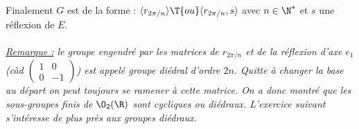 \documentclass[8pt]{book}
\begin{document}
\begin{enumerate}
		Finalement $G$ est de la forme :
		$\langle r_{2\pi/n}\rangle\T{ ou }\langle r_{2\pi/n},s\rangle$ avec $n\in \N^*$ et $s$ une réflexion de $E$.\\\\
		\textit{\underline{Remarque :} le groupe engendré par les matrices de $r_{2\pi/n}$ et de la réflexion d'axe $e_1$ (càd $\begin{pmatrix}
				1&0\\
				0&-1
			\end{pmatrix}$) est appelé groupe diédral d'ordre $2n$. Quitte à changer la base au départ on peut toujours se ramener à cette matrice. On a donc montré que les sous-groupes finis de $\O_2(\R)$ sont cycliques ou diédraux. L'exercice suivant s'intéresse de plus près aux groupes diédraux.}
	\end{enumerate}
	
\end{document}
